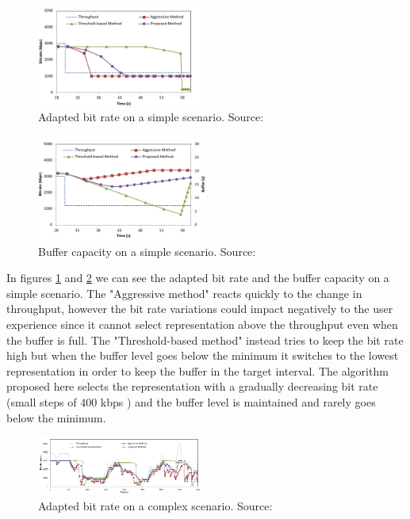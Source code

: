 \documentclass[openany]{book}
\begin{document}
\begin{figure}[ht!]
	\centering
	\includegraphics[width=0.5\textwidth]{buffer_bitrate_low}
    \caption{Adapted bit rate on a simple scenario. Source: \cite{buffer}}\label{fig:bufferbitratesimple}
\end{figure}

\begin{figure}[ht!]
	\centering
	\includegraphics[width=0.5\textwidth]{buffer_buffer_capacity}
    \caption{Buffer capacity on a simple scenario. Source: \cite{buffer}}\label{fig:buffercapacitysimple}
\end{figure}

In figures \ref{fig:bufferbitratesimple} and \ref{fig:buffercapacitysimple} we can see the adapted bit rate and the buffer capacity on a simple scenario. The "Aggressive method" reacts quickly to the change in throughput, however the bit rate variations could impact negatively to the user experience since it cannot select representation above the throughput even when the buffer is full. The "Threshold-based method" instead tries to keep the bit rate high but when the buffer level goes below the minimum it switches to the lowest representation in order to keep the buffer in the target interval. The algorithm proposed here selects the representation with a gradually decreasing bit rate (small steps of $400$ kbps \cite{buffer}) and the buffer level is maintained and rarely goes below the minimum.

\begin{figure}[ht!]
	\centering
	\includegraphics[width=0.5\textwidth]{buffer_bitrate_normal}
    \caption{Adapted bit rate on a complex scenario. Source: \cite{buffer}}\label{fig:bufferbitratecomplex}
\end{figure}
\end{document}
